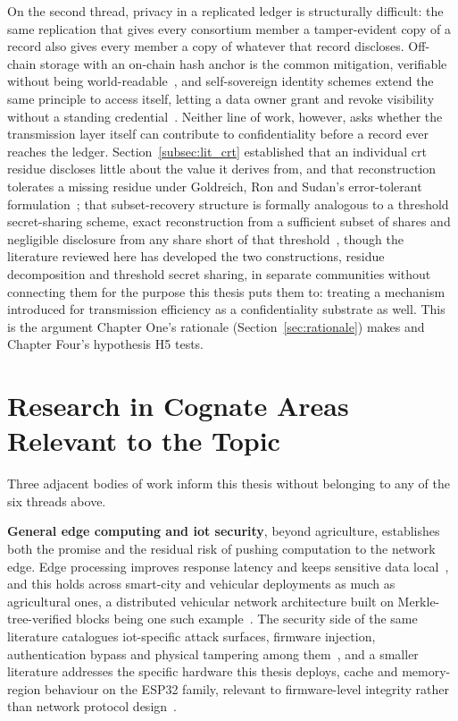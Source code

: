 \documentclass[12pt,a4paper,oneside]{book}
\begin{document}
On the second thread, privacy in a replicated ledger is structurally
difficult: the same replication that gives every consortium member a
tamper-evident copy of a record also gives every member a copy of whatever
that record discloses. Off-chain storage with an on-chain hash anchor is
the common mitigation, verifiable without being
world-readable~\cite{kim2023privacy}, and self-sovereign identity schemes
extend the same principle to access itself, letting a data owner grant and
revoke visibility without a standing
credential~\cite{amraouy2025ssi}. Neither line of work, however, asks
whether the transmission layer itself can contribute to confidentiality
before a record ever reaches the ledger. Section~\ref{subsec:lit_crt}
established that an individual \gls{crt} residue discloses little about
the value it derives from, and that reconstruction tolerates a missing
residue under Goldreich, Ron and Sudan's error-tolerant
formulation~\cite{goldreich1999china}; that subset-recovery structure is
formally analogous to a threshold secret-sharing scheme, exact
reconstruction from a sufficient subset of shares and negligible
disclosure from any share short of that
threshold~\cite{shoup2009computational}, though the literature reviewed
here has developed the two constructions, residue decomposition and
threshold secret sharing, in separate communities without connecting
them for the purpose this thesis puts them to: treating a mechanism
introduced for transmission efficiency as a confidentiality substrate as
well. This is the argument Chapter One's rationale
(Section~\ref{sec:rationale}) makes and Chapter Four's hypothesis H5 tests.

\section{Research in Cognate Areas Relevant to the Topic}
\label{sec:lit_cognate}

Three adjacent bodies of work inform this thesis without belonging to any
of the six threads above.

\textbf{General edge computing and \gls{iot} security}, beyond agriculture,
establishes both the promise and the residual risk of pushing computation
to the network edge. Edge processing improves response latency and keeps
sensitive data local~\cite{sharma2020edge, liu2019edge, wang2021edge}, and
this holds across smart-city and vehicular deployments as much as
agricultural ones, a distributed vehicular network architecture built on
Merkle-tree-verified blocks being one such
example~\cite{sharma2018merkle}. The security side of the same literature
catalogues \gls{iot}-specific attack surfaces, firmware injection,
authentication bypass and physical tampering among
them~\cite{hassan2019iotSecurity, ali2022secureIOT, anderson2021iotBlockchain,
kalaimathi2025injection, akande2018iotChallenges, knight2025iotResilience,
bashir2023IoTWear}, and a smaller literature addresses the specific
hardware this thesis deploys, cache and memory-region behaviour on the
ESP32 family, relevant to firmware-level integrity rather than network
protocol design~\cite{kumari2025rom, csdn_esp32s3_cache, esp_hal_cache}.
\end{document}
